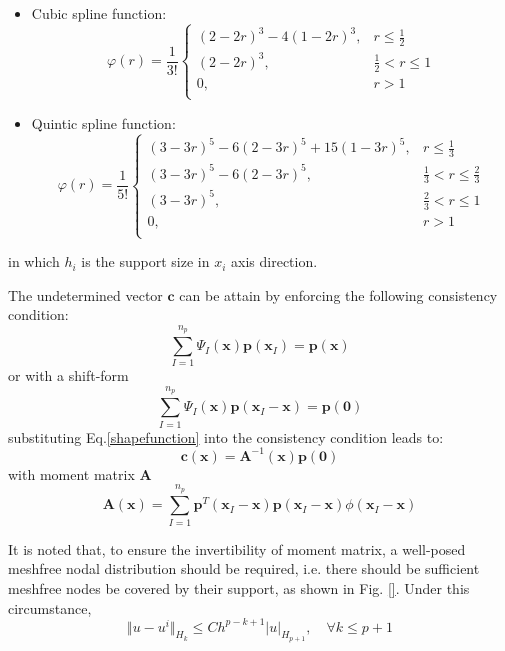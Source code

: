 \documentclass{article}
\begin{document}
\begin{itemize}
    \item Cubic spline function:
\begin{equation}
    \varphi(r) = \frac{1}{3!}
    \left \{
        \begin{array}{lr}
            (2-2r)^3 - 4(1-2r)^3, & r\le\frac{1}{2} \\
            (2-2r)^3, & \frac{1}{2}<r\le 1 \\
            0, & r> 1 \\
        \end{array}
    \right .
\end{equation}
    \item Quintic spline function:
\begin{equation}
    \varphi(r) = \frac{1}{5!}
    \left \{
        \begin{array}{lr}
            (3-3r)^5 - 6(2-3r)^5 + 15(1-3r)^5, & r\le\frac{1}{3} \\
            (3-3r)^5 - 6(2-3r)^5, & \frac{1}{3}<r\le\frac{2}{3} \\
            (3-3r)^5, & \frac{2}{3}<r\le 1 \\
            0, & r> 1 \\
        \end{array}
    \right .
\end{equation}
\end{itemize}
in which $h_i$ is the support size in $x_i$ axis direction. \par
The undetermined vector $\boldsymbol c$ can be attain by enforcing the following consistency condition:
\begin{equation}
    \sum_{I=1}^{n_p} \Psi_I(\boldsymbol x) \boldsymbol p(\boldsymbol x_I) = \boldsymbol p(\boldsymbol x)
\end{equation}
or with a shift-form
\begin{equation}
    \sum_{I=1}^{n_p} \Psi_I(\boldsymbol x) \boldsymbol p(\boldsymbol x_I - \boldsymbol x) = \boldsymbol p(\boldsymbol 0)
\end{equation}
substituting Eq.\ref{shapefunction} into the consistency condition leads to:
\begin{equation}
    \boldsymbol c(\boldsymbol x) = \boldsymbol A^{-1}(\boldsymbol x) \boldsymbol p(\boldsymbol 0)
\end{equation}
with moment matrix $\boldsymbol A$
\begin{equation}
    \boldsymbol A(\boldsymbol x) = \sum_{I=1}^{n_p}\boldsymbol p^T(\boldsymbol x_I - \boldsymbol x)\boldsymbol p(\boldsymbol x_I - \boldsymbol x)\phi(\boldsymbol x_I - \boldsymbol x)
\end{equation}\par
It is noted that, to ensure the invertibility of moment matrix, a well-posed meshfree nodal distribution should be required, i.e. there should be sufficient meshfree nodes be covered by their support, as shown in Fig. \ref{}. Under this circumstance,
\begin{equation}
\Vert u - u^i \Vert_{H_k} \le Ch^{p-k+1} \vert u \vert_{H_{p+1}}, \quad \forall k \le p+1
\end{equation}
\end{document}
